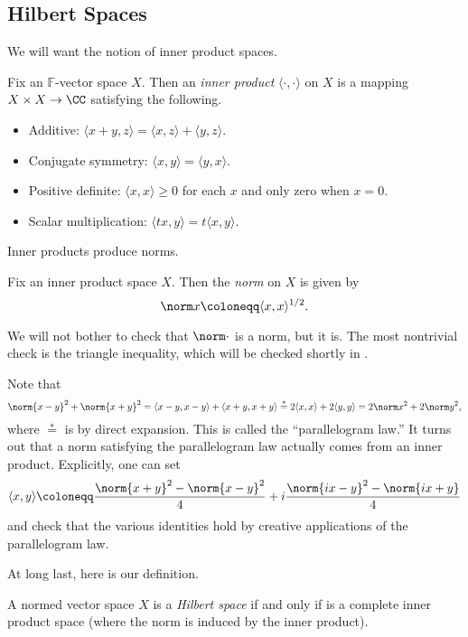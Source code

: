 \documentclass[../notes.tex]{subfiles}
\begin{document}
\subsection{Hilbert Spaces}
We will want the notion of inner product spaces.
\begin{definition}
	Fix an $\mathbb F$-vector space $X$. Then an \textit{inner product} $\langle\cdot,\cdot\rangle$ on $X$ is a mapping $X\times X\to\CC$ satisfying the following.
	\begin{itemize}
		\item Additive: $\langle x+y,z\rangle=\langle x,z\rangle+\langle y,z\rangle$.
		\item Conjugate symmetry: $\langle x,y\rangle=\langle y,x\rangle$.
		\item Positive definite: $\langle x,x\rangle\ge0$ for each $x$ and only zero when $x=0$.
		\item Scalar multiplication: $\langle tx,y\rangle=t\langle x,y\rangle$.
	\end{itemize}
\end{definition}
Inner products produce norms.
\begin{definition}
	Fix an inner product space $X$. Then the \textit{norm} on $X$ is given by
	\[\norm x\coloneqq\langle x,x\rangle^{1/2}.\]
\end{definition}
We will not bother to check that $\norm\cdot$ is a norm, but it is. The most nontrivial check is the triangle inequality, which will be checked shortly in .
\begin{remark} \label{rem:parallelogram-law}
	Note that
	\[\norm{x-y}^2+\norm{x+y}^2=\langle x-y,x-y\rangle+\langle x+y,x+y\rangle\stackrel*=2\langle x,x\rangle+2\langle y,y\rangle=2\norm x^2+2\norm y^2,\]
	where $\stackrel*=$ is by direct expansion. This is called the ``parallelogram law.'' It turns out that a norm satisfying the parallelogram law actually comes from an inner product. Explicitly, one can set
	\[\langle x,y\rangle\coloneqq\frac{\norm{x+y}^2-\norm{x-y}^2}4+i\frac{\norm{ix-y}^2-\norm{ix+y}}4\]
	and check that the various identities hold by creative applications of the parallelogram law.
\end{remark}
At long last, here is our definition.
\begin{definition}
	A normed vector space $X$ is a \textit{Hilbert space} if and only if is a complete inner product space (where the norm is induced by the inner product).
\end{definition}
\end{document}
